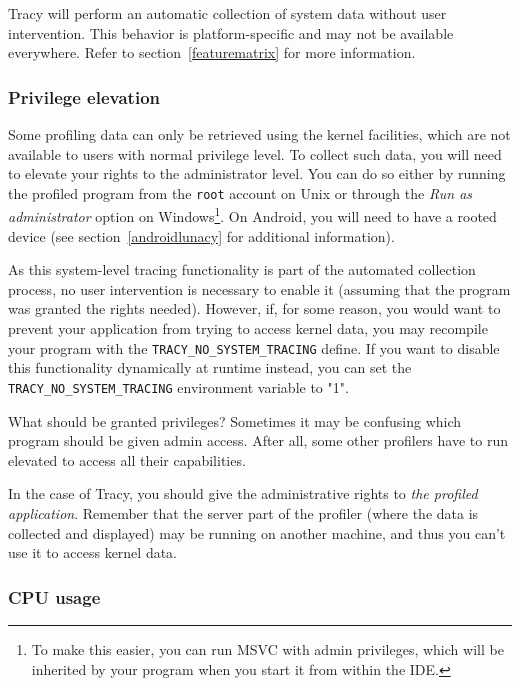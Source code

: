 \documentclass[hidelinks,titlepage,a4paper]{article}
\begin{document}
Tracy will perform an automatic collection of system data without user intervention. This behavior is platform-specific and may not be available everywhere. Refer to section~\ref{featurematrix} for more information.

\subsubsection{Privilege elevation}
\label{privilegeelevation}

Some profiling data can only be retrieved using the kernel facilities, which are not available to users with normal privilege level. To collect such data, you will need to elevate your rights to the administrator level. You can do so either by running the profiled program from the \texttt{root} account on Unix or through the \emph{Run as administrator} option on Windows\footnote{To make this easier, you can run MSVC with admin privileges, which will be inherited by your program when you start it from within the IDE.}. On Android, you will need to have a rooted device (see section~\ref{androidlunacy} for additional information).

As this system-level tracing functionality is part of the automated collection process, no user intervention is necessary to enable it (assuming that the program was granted the rights needed). However, if, for some reason, you would want to prevent your application from trying to access kernel data, you may recompile your program with the \texttt{TRACY\_NO\_SYSTEM\_TRACING} define. If you want to disable this functionality dynamically at runtime instead, you can set the \texttt{TRACY\_NO\_SYSTEM\_TRACING} environment variable to "1".

\begin{bclogo}[
noborder=true,
couleur=black!5,
logo=\bclampe
]{What should be granted privileges?}
Sometimes it may be confusing which program should be given admin access. After all, some other profilers have to run elevated to access all their capabilities.

In the case of Tracy, you should give the administrative rights to \emph{the profiled application}. Remember that the server part of the profiler (where the data is collected and displayed) may be running on another machine, and thus you can't use it to access kernel data.
\end{bclogo}

\subsubsection{CPU usage}
\end{document}
